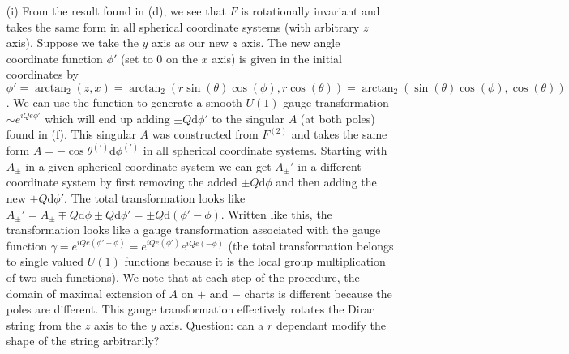 \documentclass[10pt, a4paper]{article}
\begin{document}
{\begin{enumerate}
  \item[(i)] From the result found in (d), we see that $F$ is rotationally invariant and takes the same form in all spherical coordinate systems (with arbitrary $z$ axis). Suppose we take the $y$ axis as our new $z$ axis. The new angle coordinate function $\phi'$ (set to $0$ on the $x$ axis) is given in the initial coordinates by  $\phi' = \arctan_2(z, x) = \arctan_2(r \sin(\theta)\cos(\phi), r \cos(\theta)) = \arctan_2(\sin(\theta)\cos(\phi), \cos(\theta))$. We can use the function to generate a smooth $U(1)$ gauge transformation $\sim e^{i Qe \phi'}$ which will end up adding $\pm Q\text{d}\phi'$ to the singular $A$ (at both poles) found in (f). This singular $A$ was constructed from $F^(2)$ and takes the same form $A = -\cos\theta^{(')}\text{d}\phi^{(')}$ in all spherical coordinate systems. Starting with $A_\pm$ in a given spherical coordinate system we can get $A_{\pm}'$ in a different coordinate system by first removing the added $\pm Q\text{d}\phi$ and then adding the new $\pm Q \text{d}\phi'$. The total transformation looks like $A_\pm' = A_\pm \mp Q\text{d}\phi \pm Q\text{d}\phi' = \pm Q\text{d}(\phi'-\phi)$. Written like this, the transformation looks like a gauge transformation associated with the gauge function $\gamma = e^{i Qe (\phi'-\phi)} = e^{i Qe (\phi')} e^{i Qe (-\phi)}$ (the total transformation belongs to single valued $U(1)$ functions because it is the local group multiplication of two such functions). We note that at each step of the procedure, the domain of maximal extension of $A$ on $+$ and $-$ charts is different because the poles are different. This gauge transformation effectively rotates the Dirac string from the $z$ axis to the $y$ axis. Question: can a $r$ dependant modify the shape of the string arbitrarily?
\end{enumerate}

}
\end{document}
